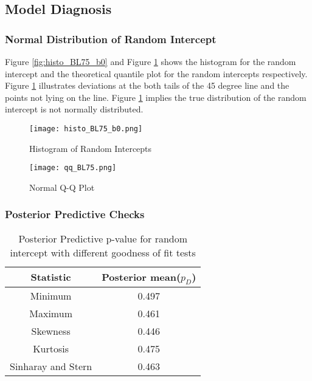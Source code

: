 \documentclass[11pt]{article}
\begin{document}
\subsection{Model Diagnosis}
\subsubsection{Normal Distribution of Random Intercept}

Figure \ref{fig:histo_BL75_b0} and Figure \ref{fig:qq_BL75} shows the histogram for the random intercept and the theoretical quantile plot for the random intercepts respectively. Figure \ref{fig:qq_BL75} illustrates deviations at the both tails of the 45 degree line and the points not lying on the line. Figure \ref{fig:qq_BL75} implies the true distribution of the random intercept is not normally distributed.

    \begin{figure}[H]
  \begin{minipage}[b]{0.4\textwidth}
    \texttt{[image: histo\_BL75\_b0.png]}
    \caption{Histogram of Random Intercepts}
    \label{fig:histo_BL75_b0}
  \end{minipage}
  \hfill
  \begin{minipage}[b]{0.45\textwidth}
    \texttt{[image: qq\_BL75.png]}
    \label{fig:qq_BL75}
    \caption{Normal Q-Q Plot}
  \end{minipage}

\end{figure}



\subsubsection{Posterior Predictive Checks}
\begin{table}[H]
\centering
\caption{Posterior Predictive p-value for random intercept with different goodness of fit tests}
\label{tab:PPC_BL75}
\begin{tabular}{@{}cc@{}}
\toprule
\textbf{Statistic} & \textbf{Posterior mean($p_{D}$)} \\ \midrule
Minimum & 0.497 \\
Maximum & 0.461 \\
Skewness & 0.446 \\
Kurtosis & 0.475 \\
Sinharay and Stern & 0.463 \\ \bottomrule
\end{tabular}
\end{table}
\end{document}
